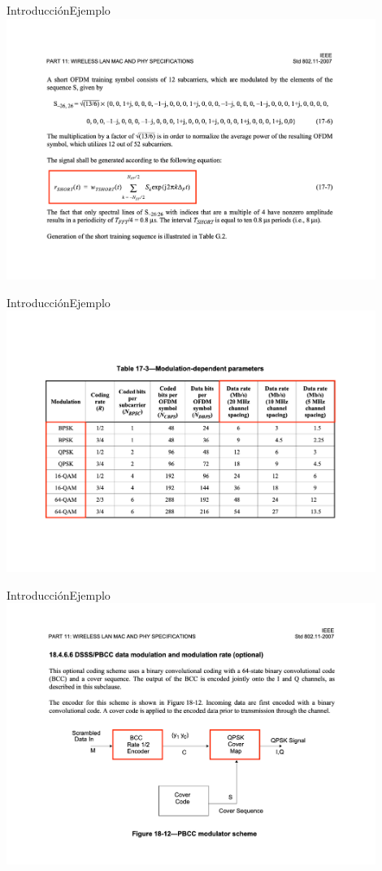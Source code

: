 \documentclass[10pt,compress]{beamer} %
\begin{document}
\begin{frame}{Introducción}{Ejemplo}
  \centering \includegraphics[width=0.9\textwidth]{./Figuras/Wifi2.pdf}
\end{frame}

\begin{frame}{Introducción}{Ejemplo}
  \centering \includegraphics[width=0.9\textwidth]{./Figuras/Wifi3.pdf}
\end{frame}

\begin{frame}{Introducción}{Ejemplo}
  \centering \includegraphics[width=0.9\textwidth]{./Figuras/Wifi4.pdf}
\end{frame}
\end{document}
